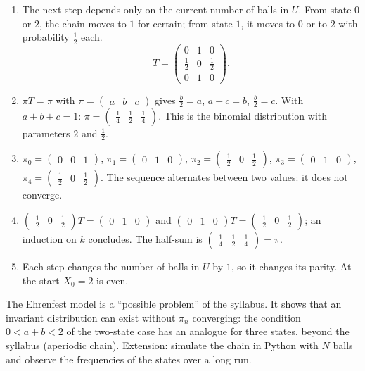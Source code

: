 \begin{solution}[Problem]
\begin{enumerate}
\item The next step depends only on the current number of balls in $U$. From state $0$ or $2$, the chain moves to $1$ for certain; from state $1$, it moves to $0$ or to $2$ with probability $\frac12$ each. \[T=\begin{pmatrix}0&1&0\\\frac12&0&\frac12\\0&1&0\end{pmatrix}.\]
\item $\pi T=\pi$ with $\pi=\begin{pmatrix}a&b&c\end{pmatrix}$ gives $\frac b2=a$, $a+c=b$, $\frac b2=c$. With $a+b+c=1$: $\pi=\begin{pmatrix}\frac14&\frac12&\frac14\end{pmatrix}$. This is the binomial distribution with parameters $2$ and $\frac12$.
\item $\pi_0=\begin{pmatrix}0&0&1\end{pmatrix}$, $\pi_1=\begin{pmatrix}0&1&0\end{pmatrix}$, $\pi_2=\begin{pmatrix}\frac12&0&\frac12\end{pmatrix}$, $\pi_3=\begin{pmatrix}0&1&0\end{pmatrix}$, $\pi_4=\begin{pmatrix}\frac12&0&\frac12\end{pmatrix}$. The sequence alternates between two values: it does not converge.
\item $\begin{pmatrix}\frac12&0&\frac12\end{pmatrix}T=\begin{pmatrix}0&1&0\end{pmatrix}$ and $\begin{pmatrix}0&1&0\end{pmatrix}T=\begin{pmatrix}\frac12&0&\frac12\end{pmatrix}$; an induction on $k$ concludes. The half-sum is $\begin{pmatrix}\frac14&\frac12&\frac14\end{pmatrix}=\pi$.
\item Each step changes the number of balls in $U$ by $1$, so it changes its parity. At the start $X_0=2$ is even.
\end{enumerate}
\end{solution}
\begin{teachernote}
The Ehrenfest model is a ``possible problem'' of the syllabus. It shows that an invariant distribution can exist without $\pi_n$ converging: the condition $0<a+b<2$ of the two-state case has an analogue for three states, beyond the syllabus (aperiodic chain). Extension: simulate the chain in Python with $N$ balls and observe the frequencies of the states over a long run.
\end{teachernote}
